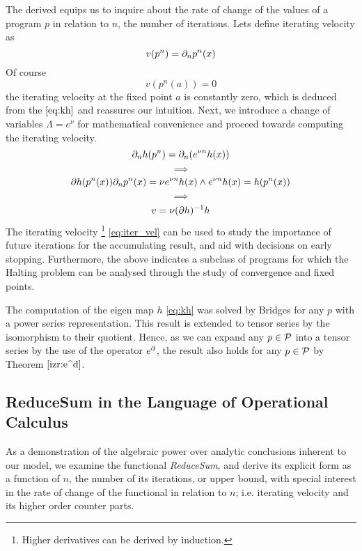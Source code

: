 The derived equips us to inquire about the rate of change of the values of a program $p$ in relation to $n$, the number of iterations. Lets define iterating velocity as
  \begin{equation}
  v(p^n)=\partial_np^n(x)
  \end{equation}
Of course
  \begin{equation}
  v(p^n(a))=0
  \end{equation}
the iterating velocity at the fixed point $a$ is constantly zero, which is deduced from the $\eqref{eq:kh}$ and reassures our intuition. Next, we introduce a change of variables $\Lambda= e^\nu$ for mathematical convenience and proceed towards computing the iterating velocity.
  $$\partial_nh(p^n)=\partial_n(e^{\nu n}h(x))$$
  $$\implies$$
  $$\partial h(p^n(x))\partial_np^n(x)=\nu e^{\nu n}h(x) \land e^{\nu n}h(x)=h(p^n(x))$$
  $$\implies$$
  \begin{equation}\label{eq:iter_vel}
  v=\nu(\partial h)^{-1}h
  \end{equation}
The iterating velocity
\footnote{Higher derivatives can be derived by induction.}
\eqref{eq:iter_vel} can be used to study the importance of future iterations for the accumulating result, and aid with decisions on early stopping. Furthermore, the above indicates a subclass of programs for which the Halting problem can be analysed through the study of convergence and fixed points.

The computation of the eigen map $h$ \eqref{eq:kh} was solved by Bridges \cite{bridges2016solution} for any $p$ with a power series representation. This result is extended to tensor series by the isomorphism to their quotient. Hence, as we can expand any $p\in\mathcal{P}$ into a tensor series by the use of the operator $e^\partial$, the result also holds for any $p\in\mathcal{P}$ by Theorem $\ref{izr:e^d}$. 


\subsection{ReduceSum in the Language of Operational Calculus}

As a demonstration of the algebraic power over analytic conclusions inherent to our model, we examine the functional \emph{ReduceSum}, and derive its explicit form as a function of $n$, the number of its iterations, or upper bound, with special interest in the rate of change of the functional in relation to $n$; i.e. iterating velocity and its higher order counter parts. 

